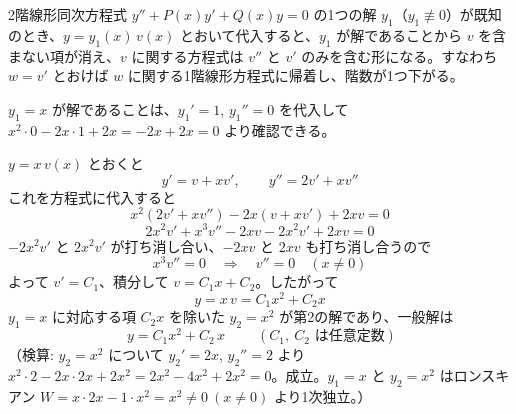 
2階線形同次方程式 $y'' + P(x)y' + Q(x)y = 0$ の1つの解 $y_{1}$（$y_1 \not\equiv 0$）が既知のとき、$y = y_{1}(x)\,v(x)$ とおいて代入すると、$y_1$ が解であることから $v$ を含まない項が消え、$v$ に関する方程式は $v''$ と $v'$ のみを含む形になる。すなわち $w = v'$ とおけば $w$ に関する1階線形方程式に帰着し、階数が1つ下がる。

$y_{1} = x$ が解であることは、$y_{1}' = 1$, $y_{1}'' = 0$ を代入して
$x^{2}\cdot 0 - 2x\cdot 1 + 2x = -2x + 2x = 0$
より確認できる。

$y = x\,v(x)$ とおくと
\[
y' = v + x v', \qquad y'' = 2v' + x v''
\]
これを方程式に代入すると
\[
x^{2}(2v' + x v'') - 2x(v + x v') + 2x v = 0
\]
\[
2x^{2} v' + x^{3} v'' - 2x v - 2x^{2} v' + 2x v = 0
\]
$-2x^2 v'$ と $2x^2 v'$ が打ち消し合い、$-2xv$ と $2xv$ も打ち消し合うので
\[
x^{3} v'' = 0
\quad\Longrightarrow\quad
v'' = 0 \quad (x \neq 0)
\]
よって $v' = C_{1}$、積分して $v = C_{1} x + C_{2}$。したがって
\[
y = x\,v = C_{1} x^{2} + C_{2} x
\]
$y_{1} = x$ に対応する項 $C_{2}x$ を除いた $y_{2} = x^{2}$ が第2の解であり、一般解は
\[
\boxed{\; y = C_{1} x^{2} + C_{2}\,x \;}
\qquad (C_{1},\ C_{2} \text{ は任意定数})
\]
（検算: $y_{2} = x^{2}$ について $y_{2}' = 2x$, $y_{2}'' = 2$ より $x^{2}\cdot 2 - 2x\cdot 2x + 2x^{2} = 2x^{2} - 4x^{2} + 2x^{2} = 0$。成立。$y_{1} = x$ と $y_{2} = x^{2}$ はロンスキアン $W = x\cdot 2x - 1\cdot x^{2} = x^{2} \neq 0\ (x\neq0)$ より1次独立。）
